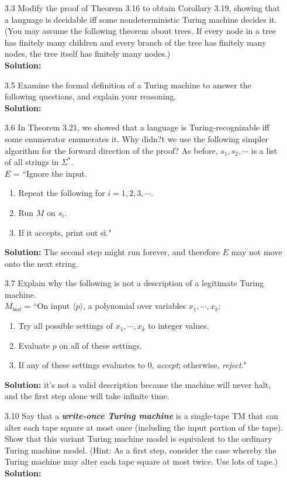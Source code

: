 \begin{enumerate}
\item[3.3]Modify the proof of Theorem 3.16 to obtain Corollary 3.19, showing that a language is decidable iff some nondeterministic Turing machine decides it. (You may assume the following theorem about trees. If every node in a tree has finitely many children and every branch of the tree has finitely many nodes, the tree itself has finitely many nodes.)
\\
\textbf{Solution:} \alreadyanswered

\item[3.5]Examine the formal definition of a Turing machine to answer the following questions, and explain your reasoning.
\\
\textbf{Solution:} \alreadyanswered

\item[3.6]In Theorem 3.21, we showed that a language is Turing-recognizable iff some enumerator enumerates it. Why didn?t we use the following simpler algorithm for the forward direction of the proof? As before, $s_1, s_2, \cdots$ is a list of all strings in $\Sigma^*$.
\\
$E$ = ``Ignore the input.
\begin{enumerate}
\item Repeat the following for $i=1,2,3,\cdots$.
\item Run $M$ on $s_i$.
\item If it accepts, print out si."
\end{enumerate}
\textbf{Solution:} The second step might run forever, and therefore $E$ may not move onto the next string.  

\item[3.7]Explain why the following is not a description of a legitimate Turing machine.
\\
$M_{bad}$ = ``On input $\langle p \rangle$, a polynomial over variables $x_1, \cdots, x_k$:
\begin{enumerate}
\item Try all possible settings of $x_1, \cdots, x_k$ to integer values.
\item Evaluate $p$ on all of these settings.
\item If any of these settings evaluates to 0, \emph{accept}; otherwise, \emph{reject}."
\end{enumerate}
\textbf{Solution:} it's not a valid description because the machine will never halt, and the first step alone will take infinite time. 

\item[3.10]Say that a \textbf{\emph{write-once Turing machine}} is a single-tape TM that can alter each tape square at most once (including the input portion of the tape). Show that this variant Turing machine model is equivalent to the ordinary Turing machine model. (Hint: As a first step, consider the case whereby the Turing machine may alter each tape square at most twice. Use lots of tape.)
\\
\textbf{Solution:} \alreadyanswered


\end{enumerate}
